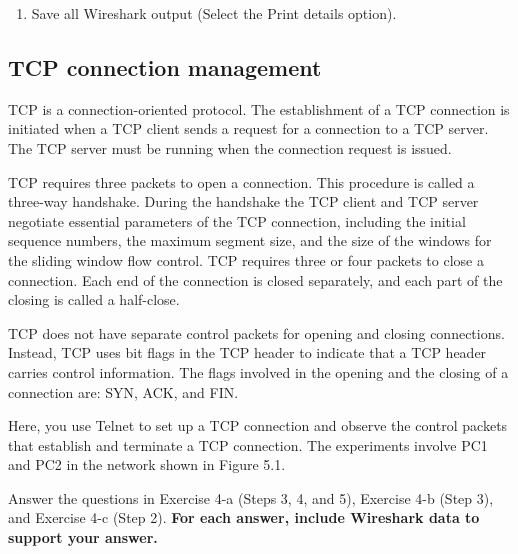 \begin{questions}
\end{questions}

\begin{enumerate}[resume]
	\item Save all Wireshark output (Select the Print details option).
\end{enumerate}

\begin{questions}
\end{questions}

\newpage
\subsection{TCP connection management}

TCP is a connection-oriented protocol. The establishment of a TCP connection is initiated when a TCP client sends a request for a connection to a TCP server. The TCP server must be running when the connection request is issued.

TCP requires three packets to open a connection. This procedure is called a three-way handshake. During the handshake the TCP client and TCP server negotiate essential parameters of the TCP connection, including the initial sequence numbers, the maximum segment size, and the size of the windows for the sliding window flow control. TCP requires three or four packets to close a connection. Each end of the connection is closed separately, and each part of the closing is called a half-close.

TCP does not have separate control packets for opening and closing connections. Instead, TCP uses bit flags in the TCP header to indicate that a TCP header carries control information. The flags involved in the opening and the closing of a connection are: SYN, ACK, and FIN.

Here, you use Telnet to set up a TCP connection and observe the control packets that establish and terminate a TCP connection. The experiments involve PC1 and PC2 in the network shown in Figure 5.1.

Answer the questions in Exercise 4-a (Steps 3, 4, and 5), Exercise 4-b (Step 3), and Exercise 4-c (Step 2). \textbf{For each answer, include Wireshark data to support your answer.}

